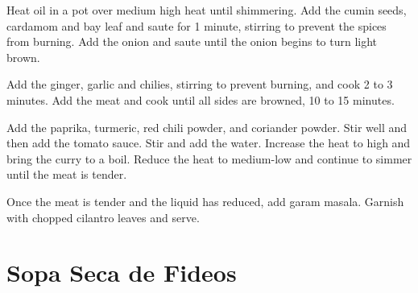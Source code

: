\documentclass[oneside]{book}  %
\def\thisrecipe{}  %
\newcommand{\recipe}[1]{\section{#1}\def\thisrecipe{: #1}} %
\begin{document}
\begin{directions}
  \item Heat oil in a pot over medium high heat until shimmering. Add the cumin
  seeds, cardamom and bay leaf and saute for 1 minute, stirring to prevent the
  spices from burning. Add the onion and saute until the onion begins to turn
  light brown.

  \item Add the ginger, garlic and chilies, stirring to prevent burning, and
  cook 2 to 3 minutes. Add the meat and cook until all sides are browned, 10
  to 15 minutes.

  \item Add the paprika, turmeric, red chili powder, and coriander powder. Stir
  well and then add the tomato sauce. Stir and add the water. Increase the heat
  to high and bring the curry to a boil. Reduce the heat to medium-low and
  continue to simmer until the meat is tender.

  \item Once the meat is tender and the liquid has reduced, add garam masala.
  Garnish with chopped cilantro leaves and serve.
\end{directions}
\recipe{Sopa Seca de Fideos} \label{recipe:sopa_seca_de_fideos} %
\end{document}

